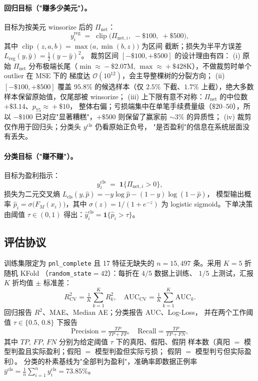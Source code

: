 \documentclass[sigconf,nonacm,10pt]{acmart}
\newcommand{\Pnet}{\Pi_{\text{net}}}
\begin{document}
\paragraph{回归目标（"赚多少美元"）。}
目标为按美元 winsorize 后的 $\Pnet$：
\begin{equation}
y^{\text{reg}}_i \;=\; \operatorname{clip}\!\bigl(\Pi_{\text{net},i},\;
-\$100,\; +\$500\bigr),
\label{eq:reg-target}
\end{equation}
其中 $\operatorname{clip}(z,a,b)=\max\!\bigl(a,\min(b,z)\bigr)$ 为区间
截断；损失为半平方误差
$L_{\text{reg}}(y,\hat y)=\tfrac12(y-\hat y)^2$。
裁剪区间 $[-\$100,+\$500]$ 的设计理由有四：
(i) 原始 $\Pnet$ 分布极端长尾（$\min\!\approx\!-\$2.07$M,
$\max\!\approx\!+\$428$K），不做裁剪时单个 outlier 在 MSE 下的
梯度达 $\mathcal{O}(10^{12})$，会主导整棵树的分裂方向；
(ii) $[-\$100,+\$500]$ 覆盖 $95.8\%$ 的候选样本（仅 $2.5\%$
下截、$1.7\%$ 上截），绝大多数样本保留原始值，仅尾部被 winsorize；
(iii) 上下限有意不对称：$\Pnet$ 的中位数 $+\$3.14$、$p_{75}\!\approx\!+\$10$，
整体右偏；亏损端集中在单笔手续费量级（$\$20$--$50$），所以
$-\$100$ 已对应"显著糟糕"，$+\$500$ 则保留了赢家前 $\sim\!3\%$
的异质性；
(iv) 裁剪仅作用于回归头；分类头 $y^{\text{cls}}$ 仍看原始正负号，
"是否盈利"的信息在系统层面没有丢失。

\paragraph{分类目标（"赚不赚"）。}
目标为盈利指示：
\begin{equation}
y^{\text{cls}}_i \;=\; \mathbf{1}\{\Pi_{\text{net},i}>0\},
\label{eq:cls-target}
\end{equation}
损失为二元交叉熵
$L_{\text{cls}}(y,\hat p)=-y\log\hat p-(1-y)\log(1-\hat p)$，
模型输出概率 $\hat p_i=\sigma\!\bigl(F_M(x_i)\bigr)$，其中
$\sigma(z)=1/(1+e^{-z})$ 为 logistic sigmoid。下单决策由阈值
$\tau\in(0,1)$ 得出：$\hat y^{\text{cls}}_i = \mathbf{1}\{\hat p_i>\tau\}$。

\subsection{评估协议}

训练集限定为 \texttt{pnl\_complete} 且 17 特征无缺失的
$n=15{,}497$ 条。采用 $K=5$ 折随机 KFold
（\texttt{random\_state}$=42$）：每折在 $4/5$ 数据上训练、
$1/5$ 上测试，汇报 $K$ 折均值 $\pm$ 标准差：
\begin{equation}
R^2_{\text{CV}} = \tfrac{1}{K}\sum_{k=1}^{K} R^2_k,\quad
\text{AUC}_{\text{CV}} = \tfrac{1}{K}\sum_{k=1}^{K} \text{AUC}_k.
\label{eq:cv}
\end{equation}
回归报告 $R^2$、MAE、Median AE；分类报告 AUC、Log-Loss，
并在两个工作阈值 $\tau\in\{0.5,\, 0.8\}$ 下报告
\begin{equation}
\text{Precision}=\tfrac{TP}{TP+FP},\quad
\text{Recall}=\tfrac{TP}{TP+FN},
\label{eq:pr}
\end{equation}
其中 $TP,\,FP,\,FN$ 分别为给定阈值 $\tau$ 下的真阳、假阳、假阴
样本数（真阳 $=$ 模型判盈且实际盈利；假阳 $=$ 模型判盈但实际亏损；
假阴 $=$ 模型判亏但实际盈利）。
分类的朴素基线为"全部判为盈利"，准确率即数据正例率
$\bar y^{\text{cls}}=\tfrac{1}{n}\sum_{i=1}^{n} y^{\text{cls}}_i=73.85\%$。
\end{document}
